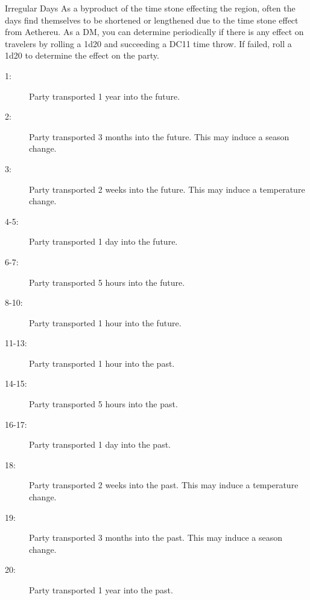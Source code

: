 \begin{commentbox}{Irregular Days}
	As a byproduct of the time stone effecting the region, often the days find themselves to be shortened or lengthened due to the time stone effect from Aethereu. As a DM, you can determine periodically if there is any effect on travelers by rolling a 1d20 and succeeding a DC11 time throw. If failed, roll a 1d20 to determine the effect on the party.
	\hline
	\begin{description}
		\item[1:] Party transported 1 year into the future. 
		\item[2:] Party transported 3 months into the future. This may induce a season change. 
		\item[3:] Party transported 2 weeks into the future. This may induce a temperature change.
		\item[4-5:] Party transported 1 day into the future. 
		\item[6-7:] Party transported 5 hours into the future. 
		\item[8-10:] Party transported 1 hour into the future. 
		\item[11-13:] Party transported 1 hour into the past. 
		\item[14-15:] Party transported 5 hours into the past. 
		\item[16-17:] Party transported 1 day into the past. 
		\item[18:] Party transported 2 weeks into the past. This may induce a temperature change. 
		\item[19:] Party transported 3 months into the past. This may induce a season change. 
		\item[20:] Party transported 1 year into the past. 
	\end{description}
\end{commentbox}

